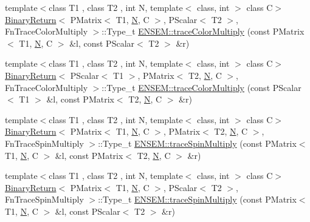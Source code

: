 \begin{DoxyCompactItemize}
\item 
{\footnotesize template$<$class T1 , class T2 , int N, template$<$ class, int $>$ class C$>$ }\\\mbox{\hyperlink{structBinaryReturn}{Binary\+Return}}$<$ P\+Matrix$<$ T1, \mbox{\hyperlink{adat__devel_2lib_2hadron_2operator__name__util_8cc_a7722c8ecbb62d99aee7ce68b1752f337}{N}}, C $>$, P\+Scalar$<$ T2 $>$, Fn\+Trace\+Color\+Multiply $>$\+::Type\+\_\+t \mbox{\hyperlink{group__primmatrix_ga34f5dfd94ab05f405e04e73c9e342aeb}{E\+N\+S\+E\+M\+::trace\+Color\+Multiply}} (const P\+Matrix$<$ T1, \mbox{\hyperlink{adat__devel_2lib_2hadron_2operator__name__util_8cc_a7722c8ecbb62d99aee7ce68b1752f337}{N}}, C $>$ \&l, const P\+Scalar$<$ T2 $>$ \&r)
\item 
{\footnotesize template$<$class T1 , class T2 , int N, template$<$ class, int $>$ class C$>$ }\\\mbox{\hyperlink{structBinaryReturn}{Binary\+Return}}$<$ P\+Scalar$<$ T1 $>$, P\+Matrix$<$ T2, \mbox{\hyperlink{adat__devel_2lib_2hadron_2operator__name__util_8cc_a7722c8ecbb62d99aee7ce68b1752f337}{N}}, C $>$, Fn\+Trace\+Color\+Multiply $>$\+::Type\+\_\+t \mbox{\hyperlink{group__primmatrix_gad73631cec5794d9c294bbf815af14cc0}{E\+N\+S\+E\+M\+::trace\+Color\+Multiply}} (const P\+Scalar$<$ T1 $>$ \&l, const P\+Matrix$<$ T2, \mbox{\hyperlink{adat__devel_2lib_2hadron_2operator__name__util_8cc_a7722c8ecbb62d99aee7ce68b1752f337}{N}}, C $>$ \&r)
\item 
{\footnotesize template$<$class T1 , class T2 , int N, template$<$ class, int $>$ class C$>$ }\\\mbox{\hyperlink{structBinaryReturn}{Binary\+Return}}$<$ P\+Matrix$<$ T1, \mbox{\hyperlink{adat__devel_2lib_2hadron_2operator__name__util_8cc_a7722c8ecbb62d99aee7ce68b1752f337}{N}}, C $>$, P\+Matrix$<$ T2, \mbox{\hyperlink{adat__devel_2lib_2hadron_2operator__name__util_8cc_a7722c8ecbb62d99aee7ce68b1752f337}{N}}, C $>$, Fn\+Trace\+Spin\+Multiply $>$\+::Type\+\_\+t \mbox{\hyperlink{group__primmatrix_gabc920df179ac4bd2438224848ec237af}{E\+N\+S\+E\+M\+::trace\+Spin\+Multiply}} (const P\+Matrix$<$ T1, \mbox{\hyperlink{adat__devel_2lib_2hadron_2operator__name__util_8cc_a7722c8ecbb62d99aee7ce68b1752f337}{N}}, C $>$ \&l, const P\+Matrix$<$ T2, \mbox{\hyperlink{adat__devel_2lib_2hadron_2operator__name__util_8cc_a7722c8ecbb62d99aee7ce68b1752f337}{N}}, C $>$ \&r)
\item 
{\footnotesize template$<$class T1 , class T2 , int N, template$<$ class, int $>$ class C$>$ }\\\mbox{\hyperlink{structBinaryReturn}{Binary\+Return}}$<$ P\+Matrix$<$ T1, \mbox{\hyperlink{adat__devel_2lib_2hadron_2operator__name__util_8cc_a7722c8ecbb62d99aee7ce68b1752f337}{N}}, C $>$, P\+Scalar$<$ T2 $>$, Fn\+Trace\+Spin\+Multiply $>$\+::Type\+\_\+t \mbox{\hyperlink{group__primmatrix_gab5fbf23688b38c3209c80d2a9a22b3d0}{E\+N\+S\+E\+M\+::trace\+Spin\+Multiply}} (const P\+Matrix$<$ T1, \mbox{\hyperlink{adat__devel_2lib_2hadron_2operator__name__util_8cc_a7722c8ecbb62d99aee7ce68b1752f337}{N}}, C $>$ \&l, const P\+Scalar$<$ T2 $>$ \&r)

\end{DoxyCompactItemize}
